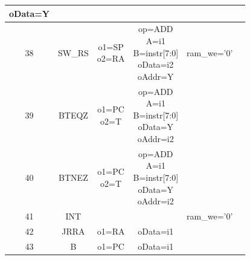 \documentclass[10pt]{article}
\makeatletter
\newcommand{\zcell}[2]{\begin{tabular}{@{}#1@{}}#2\end{tabular}}
\makeatother
\begin{document}
\begin{CJK}{UTF8}{gbsn}
\begin{center}
\begin{longtable}{|c|c|c|c|c|c|}
{								   oData=Y}           &                         &    \\\hline
38 & SW\_RS    &\zcell{c}{o1=SP\\
				o2=RA}            &\zcell{c}{op=ADD\\
								   A=i1\\B=instr[7:0]\\
								   oData=i2\\
								   oAddr=Y}           &ram\_we='0'              &    \\\hline
39 & BTEQZ     &\zcell{c}{o1=PC\\
				o2=T}             &\zcell{c}{op=ADD\\
								   A=i1\\B=instr[7:0]\\
								   oData=Y\\
								   oAddr=i2}          &                         &    \\\hline
40 & BTNEZ     &\zcell{c}{o1=PC\\
				o2=T       }      &\zcell{c}{op=ADD\\
								   A=i1\\B=instr[7:0]\\
								   oData=Y\\
								   oAddr=i2}          &                         &    \\\hline
41 & INT       &                  &                   &ram\_we='0'              &    \\\hline
42 & JRRA      &o1=RA             &oData=i1           &                         &    \\\hline
43 & B         &o1=PC             &oData=i1           &                         &    \\\hline


\end{longtable}
\end{center}

\end{CJK}
\end{document}
